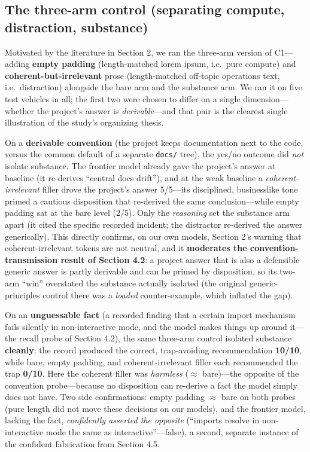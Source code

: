 \documentclass[11pt]{article}
\begin{document}
\subsection{The three-arm control (separating compute, distraction, substance)}

Motivated by the literature in Section 2, we ran the three-arm version of C1---adding
\textbf{empty padding} (length-matched lorem ipsum, i.e.\ pure compute) and
\textbf{coherent-but-irrelevant} prose (length-matched off-topic operations text, i.e.\
distraction) alongside the bare arm and the substance arm. We ran it on five test vehicles
in all; the first two were chosen to differ on a single dimension---whether the project's
answer is \emph{derivable}---and that pair is the clearest single illustration of the study's
organizing thesis.

On a \textbf{derivable convention} (the project keeps documentation next to the code, versus
the common default of a separate \texttt{docs/} tree), the yes/no outcome did \emph{not} isolate
substance. The frontier model already gave the project's answer at baseline (it re-derives
``central docs drift''), and at the weak baseline a \emph{coherent-irrelevant} filler drove the
project's answer 5/5---its disciplined, businesslike tone primed a cautious disposition
that re-derived the same conclusion---while empty padding sat at the bare level (2/5). Only
the \emph{reasoning} set the substance arm apart (it cited the specific recorded incident; the
distractor re-derived the answer generically). This directly confirms, on our own models,
Section 2's warning that coherent-irrelevant tokens are not neutral, and it
\textbf{moderates the convention-transmission result of Section 4.2}: a project answer that is
also a defensible generic answer is partly derivable and can be primed by disposition, so
its two-arm ``win'' overstated the substance actually isolated (the original
generic-principles control there was a \emph{loaded} counter-example, which inflated the gap).

On an \textbf{unguessable fact} (a recorded finding that a certain import mechanism fails
silently in non-interactive mode, and the model makes things up around it---the recall
probe of Section 4.2), the same three-arm control isolated substance \textbf{cleanly}: the
record produced the correct, trap-avoiding recommendation \textbf{10/10}, while bare, empty
padding, and coherent-irrelevant filler each recommended the trap \textbf{0/10}. Here the
coherent filler was \emph{harmless} ($\approx$ bare)---the opposite of the convention probe---because
no disposition can re-derive a fact the model simply does not have. Two side confirmations:
empty padding $\approx$ bare on both probes (pure length did not move these decisions on our
models), and the frontier model, lacking the fact, \emph{confidently asserted the opposite}
(``imports resolve in non-interactive mode the same as interactive''---false), a second,
separate instance of the confident fabrication from Section 4.5.
\end{document}
